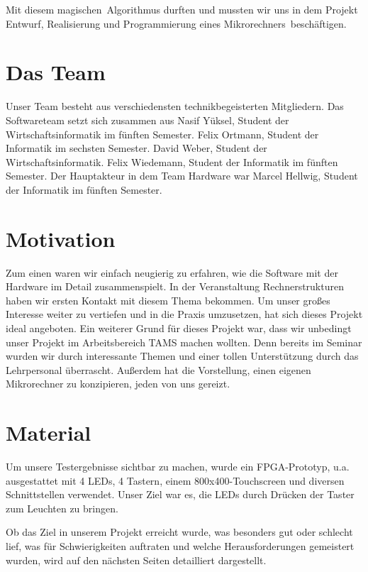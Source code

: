 Mit diesem \glqq magischen\grqq \ Algorithmus durften und mussten wir uns in dem Projekt \glqq Entwurf, Realisierung und Programmierung eines Mikrorechners\grqq \ beschäftigen. 

\section{Das Team}
Unser Team besteht aus verschiedensten technikbegeisterten Mitgliedern. Das Softwareteam setzt sich zusammen aus Nasif Yüksel, Student der Wirtschaftsinformatik im fünften Semester.  Felix Ortmann, Student der Informatik im sechsten Semester. David Weber, Student der Wirtschaftsinformatik. Felix Wiedemann, Student der Informatik im fünften Semester. Der Hauptakteur in dem Team Hardware war Marcel Hellwig, Student der Informatik im fünften Semester.

\section{Motivation}
Zum einen waren wir einfach neugierig zu erfahren, wie die Software mit der Hardware im Detail zusammenspielt. In der Veranstaltung Rechnerstrukturen haben wir ersten Kontakt mit diesem Thema bekommen. Um unser großes Interesse weiter zu vertiefen und in die Praxis umzusetzen, hat sich dieses Projekt ideal angeboten.
Ein weiterer Grund für dieses Projekt war, dass wir unbedingt unser Projekt im Arbeitsbereich TAMS machen wollten. Denn bereits im Seminar wurden wir durch interessante Themen und einer tollen Unterstützung durch das Lehrpersonal überrascht.
Außerdem hat die Vorstellung, einen eigenen Mikrorechner zu konzipieren, jeden von uns gereizt.

\section{Material}
Um unsere Testergebnisse sichtbar zu machen, wurde ein FPGA-Prototyp, u.a. ausgestattet mit 4 LEDs, 4 Tastern, einem 800x400-Touchscreen und diversen Schnittstellen verwendet. Unser Ziel war es, die LEDs durch Drücken der Taster zum Leuchten zu bringen.

Ob das Ziel in unserem Projekt erreicht wurde, was besonders gut oder schlecht lief, was für Schwierigkeiten auftraten und welche Herausforderungen gemeistert wurden, wird auf den nächsten Seiten detailliert dargestellt. 
